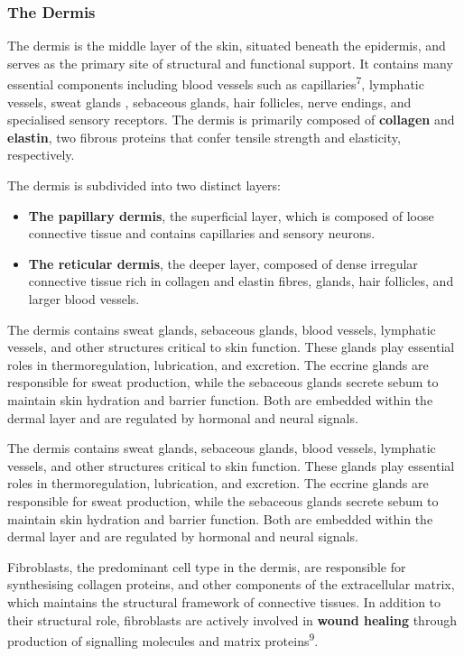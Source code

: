 \documentclass[
]{article}
\begin{document}
\subsubsection{The Dermis}\label{the-dermis}

The dermis is the middle layer of the skin, situated beneath the
epidermis, and serves as the primary site of structural and functional
support. It contains many essential components including blood vessels
such as capillaries\textsuperscript{7}, lymphatic vessels, sweat glands
, sebaceous glands, hair follicles, nerve endings, and specialised
sensory receptors. The dermis is primarily composed of \textbf{collagen}
and \textbf{elastin}, two fibrous proteins that confer tensile strength
and elasticity, respectively.

The dermis is subdivided into two distinct layers:

\begin{itemize}
\item
  \textbf{The papillary dermis}, the superficial layer, which is
  composed of loose connective tissue and contains capillaries and
  sensory neurons.
\item
  \textbf{The reticular dermis}, the deeper layer, composed of dense
  irregular connective tissue rich in collagen and elastin fibres,
  glands, hair follicles, and larger blood vessels.
\end{itemize}

The dermis contains sweat glands, sebaceous glands, blood vessels,
lymphatic vessels, and other structures critical to skin function. These
glands play essential roles in thermoregulation, lubrication, and
excretion. The eccrine glands are responsible for sweat production,
while the sebaceous glands secrete sebum to maintain skin hydration and
barrier function. Both are embedded within the dermal layer and are
regulated by hormonal and neural signals.

The dermis contains sweat glands, sebaceous glands, blood vessels,
lymphatic vessels, and other structures critical to skin function. These
glands play essential roles in thermoregulation, lubrication, and
excretion. The eccrine glands are responsible for sweat production,
while the sebaceous glands secrete sebum to maintain skin hydration and
barrier function. Both are embedded within the dermal layer and are
regulated by hormonal and neural signals.

Fibroblasts, the predominant cell type in the dermis, are responsible
for synthesising collagen proteins, and other components of the
extracellular matrix, which maintains the structural framework of
connective tissues. In addition to their structural role, fibroblasts
are actively involved in \textbf{wound healing} through production of
signalling molecules and matrix proteins\textsuperscript{9}.
\end{document}
